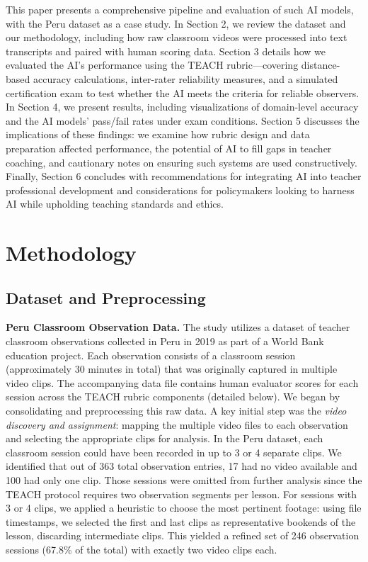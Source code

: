\documentclass[12pt]{article}
\begin{document}
This paper presents a comprehensive pipeline and evaluation of such AI models, with the Peru dataset as a case study. In Section 2, we review the dataset and our methodology, including how raw classroom videos were processed into text transcripts and paired with human scoring data. Section 3 details how we evaluated the AI’s performance using the TEACH rubric—covering distance-based accuracy calculations, inter-rater reliability measures, and a simulated certification exam to test whether the AI meets the criteria for reliable observers. In Section 4, we present results, including visualizations of domain-level accuracy and the AI models’ pass/fail rates under exam conditions. Section 5 discusses the implications of these findings: we examine how rubric design and data preparation affected performance, the potential of AI to fill gaps in teacher coaching, and cautionary notes on ensuring such systems are used constructively. Finally, Section 6 concludes with recommendations for integrating AI into teacher professional development and considerations for policymakers looking to harness AI while upholding teaching standards and ethics.

\section{Methodology}
\label{sec:methods}
\subsection{Dataset and Preprocessing}
\noindent \textbf{Peru Classroom Observation Data.} The study utilizes a dataset of teacher classroom observations collected in Peru in 2019 as part of a World Bank education project. Each observation consists of a classroom session (approximately 30 minutes in total) that was originally captured in multiple video clips. The accompanying data file contains human evaluator scores for each session across the TEACH rubric components (detailed below). We began by consolidating and preprocessing this raw data. A key initial step was the \textit{video discovery and assignment}: mapping the multiple video files to each observation and selecting the appropriate clips for analysis. In the Peru dataset, each classroom session could have been recorded in up to 3 or 4 separate clips. We identified that out of 363 total observation entries, 17 had no video available and 100 had only one clip. Those sessions were omitted from further analysis since the TEACH protocol requires two observation segments per lesson. For sessions with 3 or 4 clips, we applied a heuristic to choose the most pertinent footage: using file timestamps, we selected the first and last clips as representative bookends of the lesson, discarding intermediate clips. This yielded a refined set of 246 observation sessions (67.8\% of the total) with exactly two video clips each.
\end{document}
